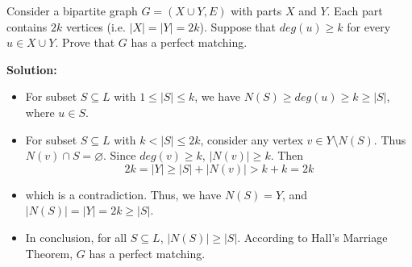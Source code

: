 \documentclass{article}
\newcounter{exercise}
\newcommand{\<}{
    \langle}
\renewcommand{\>}{
    \rangle}
\begin{document}
{\begin{exercise}
Consider a bipartite graph $G=(X\cup Y,E)$ with parts $X$ and $Y$. Each part contains $2k$ vertices (i.e. $|X|=|Y|=2k$). Suppose that $deg(u)\geq k$ for every $u\in X\cup Y$. Prove that $G$ has a perfect matching.
\end{exercise}

\textbf{Solution:}
\begin{itemize}
    \item For subset $S\subseteq L$ with $1\leq|S|\leq k$, we have $N(S)\geq deg(u)\geq k\geq |S|$, where $u\in S$.
    \item For subset $S\subseteq L$ with $k<|S|\leq 2k$, consider any vertex $v \in Y\setminus N(S)$. Thus $N(v)\cap S=\varnothing$. Since $deg(v)\geq k$, $|N(v)|\geq k$. Then 
    \begin{displaymath} 
        2k=|Y|\geq |S|+|N(v)|>k+k=2k
    \end{displaymath}
    \item which is a contradiction. Thus, we have $N(S)=Y$, and $|N(S)|=|Y|=2k\geq |S|$.
    \item In conclusion, for all $S\subseteq L$, $|N(S)|\geq |S|$. According to Hall's Marriage Theorem, $G$ has a perfect matching.
\end{itemize}
\newpage



}
\end{document}
